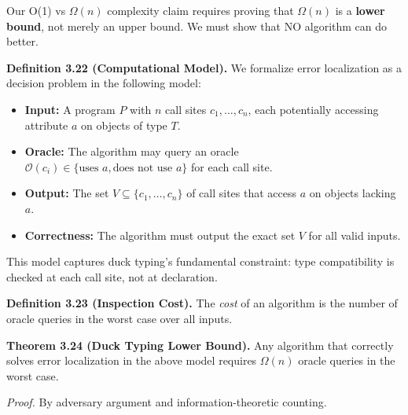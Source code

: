 Our O(1) vs $\Omega(n)$ complexity claim requires proving that $\Omega(n)$ is a
\textbf{lower bound}, not merely an upper bound. We must show that NO
algorithm can do better.

\textbf{Definition 3.22 (Computational Model).} We formalize error
localization as a decision problem in the following model:

\begin{itemize}
\tightlist
\item
  \textbf{Input:} A program \(P\) with \(n\) call sites
  \(c_1, \ldots, c_n\), each potentially accessing attribute \(a\) on
  objects of type \(T\).
\item
  \textbf{Oracle:} The algorithm may query an oracle
  \(\mathcal{O}(c_i) \in \{\text{uses } a, \text{does not use } a\}\)
  for each call site.
\item
  \textbf{Output:} The set \(V \subseteq \{c_1, \ldots, c_n\}\) of call
  sites that access \(a\) on objects lacking \(a\).
\item
  \textbf{Correctness:} The algorithm must output the exact set \(V\)
  for all valid inputs.
\end{itemize}

This model captures duck typing's fundamental constraint: type
compatibility is checked at each call site, not at declaration.

\textbf{Definition 3.23 (Inspection Cost).} The \emph{cost} of an
algorithm is the number of oracle queries in the worst case over all
inputs.

\textbf{Theorem 3.24 (Duck Typing Lower Bound).} Any algorithm that
correctly solves error localization in the above model requires
\(\Omega(n)\) oracle queries in the worst case.

\emph{Proof.} By adversary argument and information-theoretic counting.

